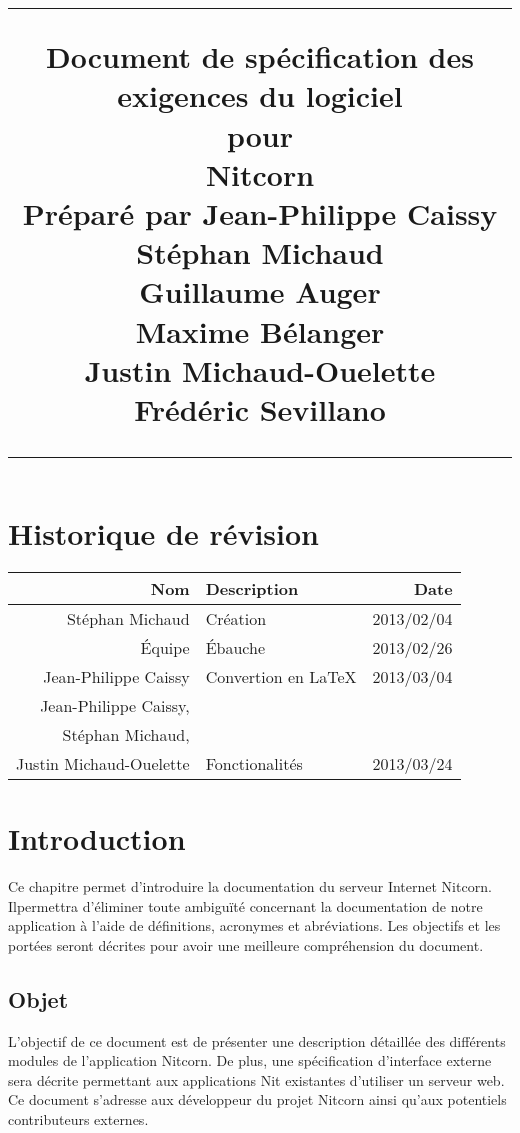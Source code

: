 \documentclass{scrreprt}
\title{%
\flushright
\rule{16cm}{5pt}\vskip1cm
\Huge{Document de spécification des exigences du logiciel}\\
\vspace{2cm}
pour\\
\vspace{2cm}
Nitcorn\\
\vspace{2cm}
Préparé par Jean-Philippe Caissy\\Stéphan Michaud\\Guillaume Auger\\Maxime
Bélanger\\Justin Michaud-Ouelette\\Frédéric Sevillano\\
\vfill
\rule{16cm}{5pt}
}
\date{}
\begin{document}
\maketitle
\tableofcontents
\chapter*{Historique de révision}
\begin{tabularx}{\textwidth}{|r|X|r|}
    \hline
    Nom & Description & Date \\
    \hline
    Stéphan Michaud & Création & 2013/02/04 \\
    \hline
    Équipe & Ébauche & 2013/02/26 \\
    \hline
    Jean-Philippe Caissy & Convertion en \LaTeX & 2013/03/04 \\
    \hline
    Jean-Philippe Caissy,\\Stéphan Michaud,\\Justin Michaud-Ouelette & Fonctionalités & 2013/03/24 \\
    \hline
\end{tabularx}

\chapter{Introduction}
Ce chapitre permet d'introduire la documentation du serveur Internet Nitcorn. Ilpermettra d'éliminer toute ambiguïté concernant la documentation
de notre application à l'aide de définitions, acronymes et
abréviations. Les objectifs et les portées seront décrites pour
avoir une meilleure compréhension du document.
\section{Objet}
L'objectif de ce document est de présenter une description
détaillée des différents modules de l'application Nitcorn. De plus,
une spécification d'interface externe sera décrite permettant aux applications
Nit existantes
d'utiliser un serveur web.\\
Ce document s'adresse aux développeur du projet Nitcorn ainsi qu'aux potentiels
contributeurs externes.
\end{document}
